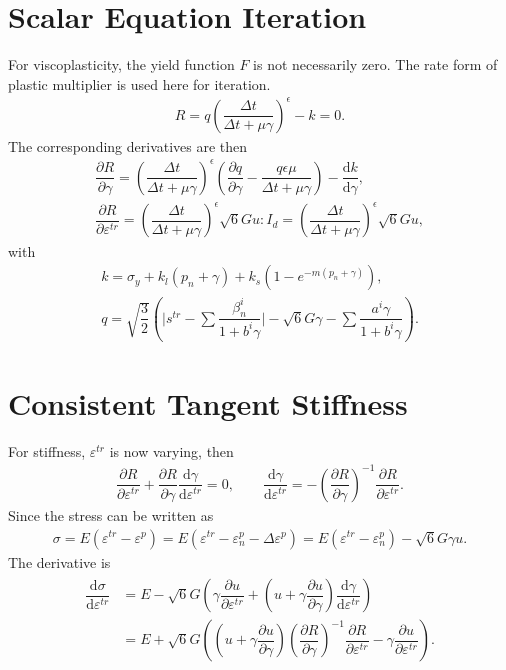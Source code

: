\documentclass[a4paper,10pt,fleqn]{article}
\newcommand*{\md}[1]{\mathrm{d}#1}
\newcommand*{\pfrac}[2]{\dfrac{\partial#1}{\partial#2}}
\newcommand*{\ddfrac}[2]{\dfrac{\md#1}{\md#2}}
\begin{document}
\section{Scalar Equation Iteration}
For viscoplasticity, the yield function $F$ is not necessarily zero. The rate form of plastic multiplier is used here for iteration.
\begin{gather*}
R=q\left(\dfrac{\Delta{}t}{\Delta{}t+\mu\gamma}\right)^\epsilon-k=0.
\end{gather*}
The corresponding derivatives are then
\begin{gather}
\pfrac{R}{\gamma}=\left(\dfrac{\Delta{}t}{\Delta{}t+\mu\gamma}\right)^\epsilon\left(\pfrac{q}{\gamma}-\dfrac{q\epsilon\mu}{\Delta{}t+\mu\gamma}\right)-\ddfrac{k}{\gamma},\\
\pfrac{R}{\varepsilon^{tr}}=\left(\dfrac{\Delta{}t}{\Delta{}t+\mu\gamma}\right)^\epsilon\sqrt{6}Gu:I_d=\left(\dfrac{\Delta{}t}{\Delta{}t+\mu\gamma}\right)^\epsilon\sqrt{6}Gu,
\end{gather}
with
\begin{gather}
k=\sigma_y+k_l\left(p_n+\gamma\right)+k_s\left(1-e^{-m\left(p_n+\gamma\right)}\right),\\
q=\sqrt{\dfrac{3}{2}}\left(\Big|s^{tr}-\sum\dfrac{\beta_n^i}{1+b^i\gamma}\Big|-\sqrt{6}G\gamma-\sum\dfrac{a^i\gamma}{1+b^i\gamma}\right).
\end{gather}
\section{Consistent Tangent Stiffness}
For stiffness, $\varepsilon^{tr}$ is now varying, then
\begin{gather}
\pfrac{R}{\varepsilon^{tr}}+\pfrac{R}{\gamma}\ddfrac{\gamma}{\varepsilon^{tr}}=0,\qquad\ddfrac{\gamma}{\varepsilon^{tr}}=-\left(\pfrac{R}{\gamma}\right)^{-1}\pfrac{R}{\varepsilon^{tr}}.
\end{gather}
Since the stress can be written as
\begin{gather}
\sigma=E(\varepsilon^{tr}-\varepsilon^p)=E(\varepsilon^{tr}-\varepsilon^p_n-\Delta\varepsilon^p)=E(\varepsilon^{tr}-\varepsilon^p_n)-\sqrt{6}G\gamma{}u.
\end{gather}
The derivative is
\begin{gather}
\begin{split}
\ddfrac{\sigma}{\varepsilon^{tr}}&=E-\sqrt{6}G\left(\gamma\pfrac{u}{\varepsilon^{tr}}+\left(u+\gamma\pfrac{u}{\gamma}\right)\ddfrac{\gamma}{\varepsilon^{tr}}\right)\\
&=E+\sqrt{6}G\left(\left(u+\gamma\pfrac{u}{\gamma}\right)\left(\pfrac{R}{\gamma}\right)^{-1}\pfrac{R}{\varepsilon^{tr}}-\gamma\pfrac{u}{\varepsilon^{tr}}\right).
\end{split}
\end{gather}
\end{document}
